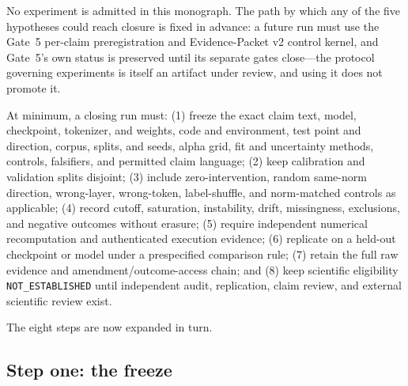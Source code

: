 No experiment is admitted in this monograph. The path by which any of the five hypotheses could reach closure is fixed in advance: a future run must use the Gate~5 per-claim preregistration and Evidence-Packet v2 control kernel, and Gate~5's own status is preserved until its separate gates close---the protocol governing experiments is itself an artifact under review, and using it does not promote it.

\begin{protocol}\label{hyp:prot:gate5}
At minimum, a closing run must: (1) freeze the exact claim text, model, checkpoint, tokenizer, and weights, code and environment, test point and direction, corpus, splits, and seeds, alpha grid, fit and uncertainty methods, controls, falsifiers, and permitted claim language; (2) keep calibration and validation splits disjoint; (3) include zero-intervention, random same-norm direction, wrong-layer, wrong-token, label-shuffle, and norm-matched controls as applicable; (4) record cutoff, saturation, instability, drift, missingness, exclusions, and negative outcomes without erasure; (5) require independent numerical recomputation and authenticated execution evidence; (6) replicate on a held-out checkpoint or model under a prespecified comparison rule; (7) retain the full raw evidence and amendment/outcome-access chain; and (8) keep scientific eligibility \texttt{NOT\_ESTABLISHED} until independent audit, replication, claim review, and external scientific review exist.
\end{protocol}

The eight steps are now expanded in turn.

\subsection{Step one: the freeze}\label{hyp:sec:step1}

